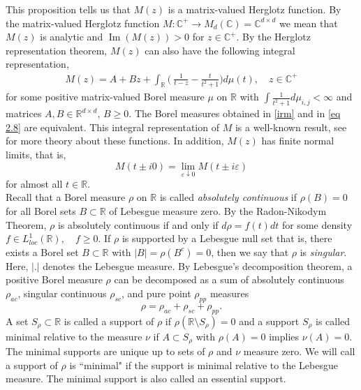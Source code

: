 \documentclass[reqno]{amsart}
\numberwithin{equation}{section}
\newcommand{\C}{\mathbb{C}}
\newcommand{\R}{\mathbb{R}}
\begin{document}
This proposition tells us that $M(z)$ is a matrix-valued Herglotz function. By the matrix-valued Herglotz function $M: \C^+ \rightarrow M_d(\C)=\C^{d\times d}$ we mean that $M(z)$ is analytic and $\operatorname{Im} (M(z)) >  0$ for $z\in \C^+.$ By the Herglotz representation theorem, $  M(z)$ can also have the following integral representation, 
\begin{align}
\label{eq 2.8}  M(z) = A + Bz + \int_{\R}\Big(\ \frac{1}{t-z}-\frac{t}{t^2+1}\Big)d \mu(t), \quad  z\in \C^+
\end{align}
for some positive matrix-valued Borel measure $\mu$
on $ \R $ with $\int\frac{1}{t^2+1}d\mu_{i,j} < \infty$ and matrices $ A , B \in\R^{d \times d },\, B \geq 0.$ The Borel measures obtained in \eqref{irm} and in \eqref{eq 2.8} are equivalent. This integral representation of $M$ is a well-known result, see \cite{SF, FG} for more theory about these functions.  In addition,  $M(z)$ has finite normal limits, that is,
\begin{equation*}
	M(t\pm i0) = \lim_{\varepsilon\downarrow 0} M(t\pm i\varepsilon)
\end{equation*}
for almost all $t\in\R$. \\

 Recall that a Borel measure $\rho$ on $\R$ is called {\em absolutely continuous } if  $ \rho(B)=0$ for all Borel sets $B\subset\R$ of Lebesgue measure zero. By the Radon-Nikodym Theorem, $\rho$ is absolutely continuous if and only if $d\rho= f(t)dt$ for some density $f \in L_{loc}^1(\R), \quad f\geq 0.$ If $\rho$ is supported by a Lebesgue null set that is, there exists a Borel set $B\subset\R$ with $ |B|=\rho(B^c)=0$, then we say that $\rho$ is {\em singular}. Here, $|.|$ denotes the Lebesgue measure. By Lebesgue's decomposition theorem, a positive Borel measure $\rho$ can be decomposed as a sum of absolutely continuous $\rho_{ac}$, singular continuous $\rho_{sc}$, and pure point $\rho_{pp}$ measures
 \begin{equation} 
 \label{ld}	\rho = \rho_{ac} + \rho_{sc} +\rho_{pp}. 
\end{equation}
A set $S_{\rho} \subset \R$ is called a support of $\rho$ if $\rho(\R \setminus S_{\rho}) = 0$ and a support $S_{\rho}$ is called minimal relative to the measure $\nu$ if $ A \subset S_{\rho} $ with $\rho (A) = 0$ implies $\nu(A)=0.$ The minimal supports are unique up to sets of $\rho$ and $\nu$ measure zero. We will call a support of $\rho$ is ``minimal" if the support is minimal relative to the Lebesgue measure. The minimal support is also called an essential support.
\end{document}
